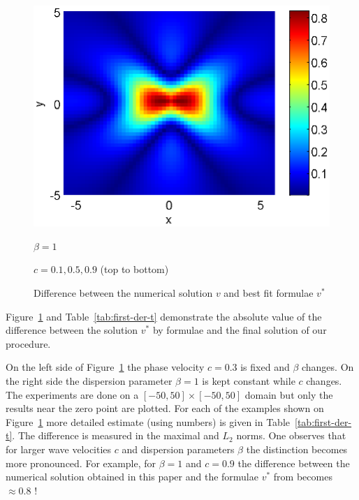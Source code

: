 \documentclass[preprint]{elsarticle}
\begin{document}
\begin{figure}[htbp]
\begin{minipage}[b]{0.5\linewidth}
		 \includegraphics[width=\linewidth]{differences/difference_c=09_beta=1.eps}
		\centerline{$\beta = 1$}
		\centerline{$c = 0.1, 0.5, 0.9$ (top to bottom)}
	\end{minipage}
	\caption{Difference between the numerical solution $v$ and best fit  formulae $v^*$}
	\label{fig:difference}
\end{figure}
Figure~\ref{fig:difference} and Table~\ref{tab:first-der-t} demonstrate the  absolute value of the difference between  the solution $v^*$ by formulae \cite{Ch2011}  and the final solution of our procedure.

On the left side of Figure~\ref{fig:difference} the phase velocity $c = 0.3$ is fixed  and $\beta$ changes. On the right side  the dispersion parameter $\beta=1$ is kept constant while $c$ changes. The experiments are done on a $[-50,  50] \times [-50,50]$  domain  but only the results near the zero point are plotted. For each of the examples shown on Figure~\ref{fig:difference} more detailed estimate (using numbers) is given in Table~\ref{tab:first-der-t}. The difference is measured in the maximal and $L_2$ norms. One observes that for larger wave velocities $c$ and dispersion parameters $\beta$ the distinction becomes more pronounced. For example, for $\beta =1$ and $c=0.9$ the difference between the numerical solution obtained in this paper and the formulae  $v^*$ from \cite{Ch2011} becomes $\approx 0.8$ !
\end{document}
